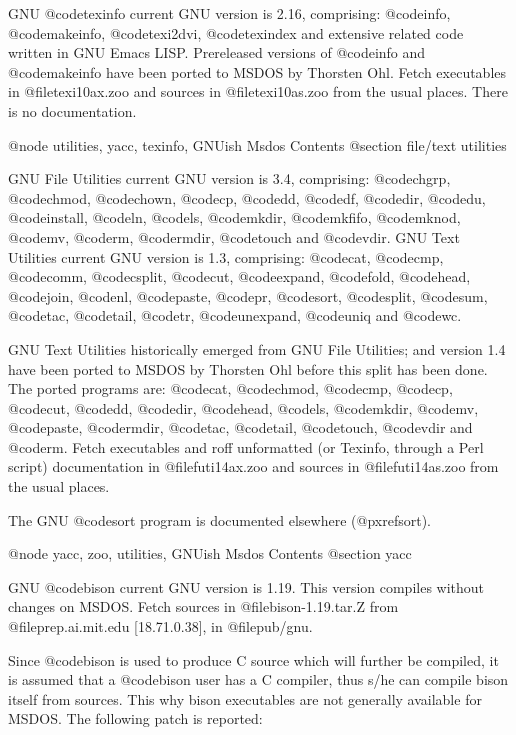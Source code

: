 GNU @code{texinfo} current GNU version is 2.16, comprising: @code{info},
@code{makeinfo}, @code{texi2dvi}, @code{texindex} and extensive related
code written in GNU Emacs LISP.  Prereleased versions of @code{info} and
@code{makeinfo} have been ported to MSDOS by Thorsten Ohl.  Fetch
executables in @file{texi10ax.zoo} and sources in @file{texi10as.zoo}
from the usual places.  There is no documentation.

@node utilities, yacc, texinfo, GNUish Msdos Contents
@section file/text utilities

GNU File Utilities current GNU version is 3.4, comprising: @code{chgrp},
@code{chmod}, @code{chown}, @code{cp}, @code{dd}, @code{df}, @code{dir},
@code{du}, @code{install}, @code{ln}, @code{ls}, @code{mkdir},
@code{mkfifo}, @code{mknod}, @code{mv}, @code{rm}, @code{rmdir},
@code{touch} and @code{vdir}.  GNU Text Utilities current GNU version is
1.3, comprising: @code{cat}, @code{cmp}, @code{comm}, @code{csplit},
@code{cut}, @code{expand}, @code{fold}, @code{head}, @code{join},
@code{nl}, @code{paste}, @code{pr}, @code{sort}, @code{split},
@code{sum}, @code{tac}, @code{tail}, @code{tr}, @code{unexpand},
@code{uniq} and @code{wc}.

GNU Text Utilities historically emerged from GNU File Utilities; and
version 1.4 have been ported to MSDOS by Thorsten Ohl before this split
has been done.  The ported programs are: @code{cat}, @code{chmod},
@code{cmp}, @code{cp}, @code{cut}, @code{dd}, @code{dir}, @code{head},
@code{ls}, @code{mkdir}, @code{mv}, @code{paste}, @code{rmdir},
@code{tac}, @code{tail}, @code{touch}, @code{vdir} and @code{rm}.  Fetch
executables and roff unformatted (or Texinfo, through a Perl script)
documentation in @file{futi14ax.zoo} and sources in @file{futi14as.zoo}
from the usual places.

The GNU @code{sort} program is documented elsewhere (@pxref{sort}).

@node yacc, zoo, utilities, GNUish Msdos Contents
@section yacc

GNU @code{bison} current GNU version is 1.19.  This version compiles
without changes on MSDOS.  Fetch sources in @file{bison-1.19.tar.Z} from
@file{prep.ai.mit.edu} [18.71.0.38], in @file{pub/gnu}.

Since @code{bison} is used to produce C source which will further be
compiled, it is assumed that a @code{bison} user has a C compiler, thus
s/he can compile bison itself from sources.  This why bison executables
are not generally available for MSDOS.  The following patch is reported:

